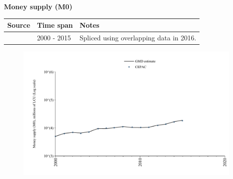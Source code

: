 \documentclass[12pt,a4paper,landscape]{article}
\begin{document}
\begin{adjustbox}{max totalsize={\paperwidth}{\paperheight},center}
\begin{minipage}[t][\textheight][t]{\textwidth}
\vspace*{0.5cm}
{}
\begin{center}
{\Large\bfseries Money supply (M0)}
\end{center}
\vspace{0.5cm}
\begin{table}[H]
\centering
\small
\begin{tabular}{|l|l|l|}
\hline
\textbf{Source} & \textbf{Time span} & \textbf{Notes} \\
\hline
\rowcolor{white}\cite{CEPAC}& 2000 - 2015 &Spliced using overlapping data in 2016. \\
\hline
\end{tabular}
\end{table}
\begin{figure}[H]
\centering
\includegraphics[width=\textwidth,height=0.6\textheight,keepaspectratio]{graphs/CUB_M0.pdf}
\end{figure}
\end{minipage}
\end{adjustbox}
\end{document}
